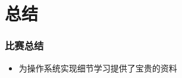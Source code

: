 \section{总结}

\begin{frame}
    \frametitle{比赛总结}

    \begin{itemize}
        \item 为操作系统实现细节学习提供了宝贵的资料
    \end{itemize}

\end{frame}